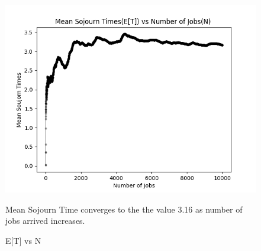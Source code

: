 \documentclass[10pt]{article}
\begin{document}
\begin{figure}
    \centering
    \includegraphics{images/mean_sojourn_times.png}
    \caption{E[T] vs N}
    \label{Mean Sojourn Time vs N}
Mean Sojourn Time converges to the the value 3.16 as number of jobs arrived increases.\\
\end{figure}
\end{document}
